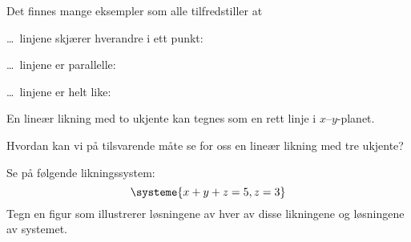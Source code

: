 \begin{losning}
Det finnes mange eksempler som alle tilfredstiller at
\begin{punkt}
\ldots\ linjene skjærer hverandre i ett punkt:
\end{punkt}
\begin{center}
\end{center}
\begin{punkt}
\ldots\ linjene er parallelle:
\end{punkt}
\begin{center}
\end{center}
\begin{punkt}
\ldots\ linjene er helt like:
\end{punkt}
\begin{center}
\end{center}
\end{losning}



\begin{oppgave}
En lineær likning med to ukjente kan tegnes som en rett linje i $x$--$y$-planet.
\begin{punkt}
Hvordan kan vi på tilsvarende måte se for oss en lineær likning med tre ukjente?
\end{punkt}
\begin{punkt}
Se på følgende likningssystem:
\[
\systeme{
  x + y + z = 5,
  z = 3
}
\]
Tegn en figur som illustrerer løsningene av hver av disse likningene
og løsningene av systemet.
\end{punkt}
\end{oppgave}
